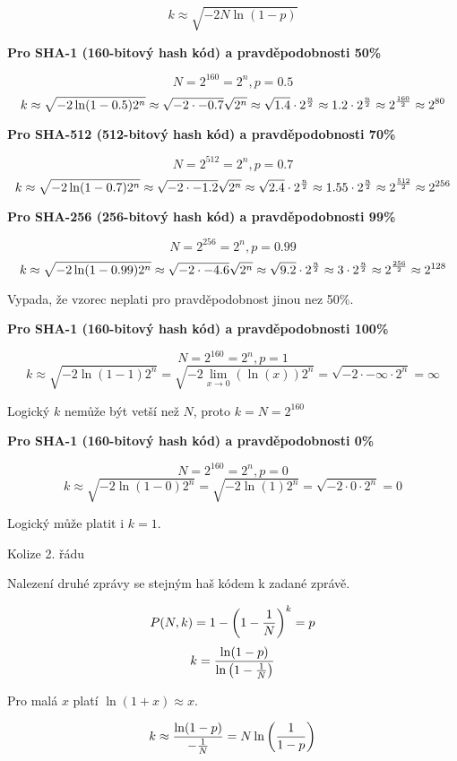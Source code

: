$$k \approx \sqrt{-2N\ln(1 - p)}$$

\bigskip\centerline
{\bf Pro SHA-1 (160-bitový hash kód) a pravděpodobnosti 50\%}

$$N = 2^{160} = 2^n, p = 0.5$$
$$
k \approx \sqrt{-2 \ln(1 - 0.5) 2^n} \approx \sqrt{-2 \cdot -0.7}\sqrt{2^n}
\approx \sqrt{1.4} \cdot 2^{n \over 2} \approx 1.2 \cdot 2^{n \over 2}
\approx 2^{160 \over 2} \approx 2^{80}
$$

\bigskip\centerline
{\bf Pro SHA-512 (512-bitový hash kód) a pravděpodobnosti 70\%}

$$N = 2^{512} = 2^n, p = 0.7$$
$$
k \approx \sqrt{-2 \ln(1 - 0.7) 2^n} \approx \sqrt{-2 \cdot -1.2}\sqrt{2^n}
\approx \sqrt{2.4} \cdot 2^{n \over 2} \approx 1.55 \cdot 2^{n \over 2}
\approx 2^{512 \over 2} \approx 2^{256}
$$

\bigskip\centerline
{\bf Pro SHA-256 (256-bitový hash kód) a pravděpodobnosti 99\%}

$$N = 2^{256} = 2^n, p = 0.99$$
$$
k \approx \sqrt{-2 \ln(1 - 0.99) 2^n} \approx \sqrt{-2 \cdot -4.6}\sqrt{2^n}
\approx \sqrt{9.2} \cdot 2^{n \over 2} \approx 3 \cdot 2^{n \over 2}
\approx 2^{256 \over 2} \approx 2^{128}
$$

\centerline{Vypada, že vzorec neplati pro pravděpodobnost jinou nez 50\%.}

\bigskip\centerline
{\bf Pro SHA-1 (160-bitový hash kód) a pravděpodobnosti 100\%}

$$N = 2^{160} = 2^n, p = 1$$
$$
k \approx \sqrt{-2 \ln(1 - 1) 2^n} = \sqrt{-2 \lim_{x \rightarrow 0} {(\ln(x))} 2^n}
= \sqrt{-2 \cdot -\infty \cdot 2^n} = \infty
$$

\centerline{Logický $k$ nemůže být vetší než $N$, proto $k = N = 2^{160}$}

\bigskip\centerline
{\bf Pro SHA-1 (160-bitový hash kód) a pravděpodobnosti 0\%}

$$N = 2^{160} = 2^n, p = 0$$
$$
k \approx \sqrt{-2 \ln(1 - 0) 2^n} = \sqrt{-2 \ln(1) 2^n}
= \sqrt{-2 \cdot 0 \cdot 2^n} = 0
$$

\centerline{Logický může platit i $k = 1$.}

\sec Kolize 2. řádu

Nalezení druhé zprávy se stejným haš kódem k zadané zprávě.

$$P(N,k) = 1 - \left( 1 - {1 \over N} \right)^k = p$$
$$k = {\ln(1 - p) \over \ln\left(1 - {1 \over N}\right)}$$

\centerline{Pro malá $x$ platí $\ln(1 + x) \approx x$.}

$$
k \approx {\ln(1 -p) \over -{1 \over N}} = N \ln\left({1 \over 1-p}\right)
$$

